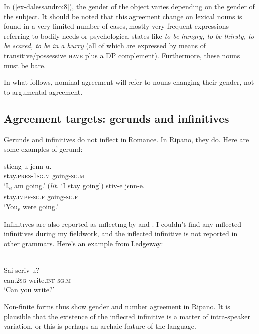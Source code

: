 \documentclass[output=paper
,modfonts
,nonflat]{langsci/langscibook}
\begin{document}
In (\ref{ex-dalessandro:8}), the gender of the object varies depending on the gender of the subject. It should be noted that this agreement change on lexical nouns is found in a very limited number of cases, mostly very frequent expressions referring to bodily needs or psychological states like \textit{to be hungry, to be thirsty, to be scared, to be in a hurry} (all of which are expressed by means of transitive/possessive \textsc{have} plus a DP complement). Furthermore, these nouns must be bare.

In what follows, nominal agreement will refer to nouns changing their gender, not to argumental agreement. 

\subsection{Agreement targets: gerunds and infinitives} \label{ex-dalessandro:1.5}
Gerunds and infinitives do not inflect in Romance. In Ripano, they do. Here are some examples of gerund:

\begin{exe}
	\ex \label{ex-dalessandro:9}	\citet[43]{Lambertelli2003} \xlist
	\ex 
	\gll stieng-u     jenn-u. \\
	stay.\textsc{pres-1sg.m} going-\textsc{sg.m}\\
	\glt `I\textsc{\textsubscript{m}} am going.' (\textit{lit.} `I stay going')
	\ex
	\gll  stiv-e     jenn-e.\\
	stay.\textsc{impf-sg.f} going-\textsc{sg.f}\\
	\glt `You\textsc{\textsubscript{f}} were going.'
	\endxlist
\end{exe}
Infinitives are also reported as inflecting by \citet{Mancini1993} and \citet{Ledgeway2012}. I couldn’t find any inflected infinitives during my fieldwork, and the inflected infinitive is not reported in other grammars. Here’s an example from Ledgeway:

\begin{exe}
\ex \label{ex-dalessandro:10} \citet[302]{Ledgeway2012}\\
\gll Sai   scriv-u?\\
can.\textsc{2sg} write.\textsc{inf-sg.m}\\
\glt `Can you write?'
\end{exe}
Non-finite forms thus show gender and number agreement in Ripano. It is plausible that the existence of the inflected infinitive is a matter of intra-speaker variation, or this is perhaps an archaic feature of the language. 
\end{document}
